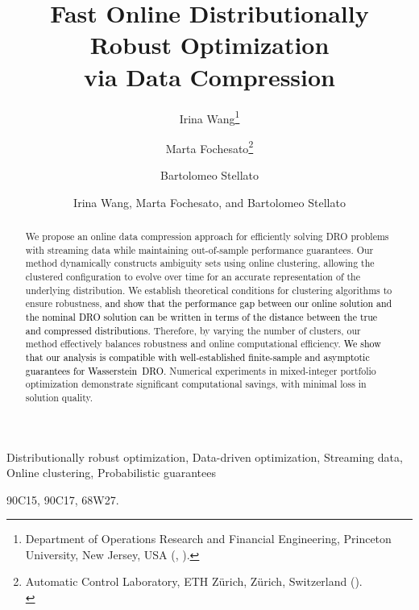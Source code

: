 \documentclass[12pt]{article}
\author{Irina Wang\thanks{Department of Operations Research and Financial Engineering, Princeton University, New Jersey, USA
  (\email{iywang@princeton.edu}, \email{bstellato@princeton.edu}).}
  \and Marta Fochesato\thanks{Automatic Control Laboratory, ETH Z\"{u}rich, Z\"{u}rich, Switzerland (\email{mfochesato@ethz.ch}).\\
  \myack
  }\\
  \and Bartolomeo Stellato\footnotemark[1]
}
\title{Fast Online Distributionally Robust Optimization \\via Data Compression }
\author{Irina Wang, Marta Fochesato, and Bartolomeo Stellato}
\newcommand{\RC}[1]{\textcolor{black}{#1}}
\newcommand{\RC}[1]{\textcolor{blue}{#1}}
\begin{document}
\maketitle

\begin{abstract}
We propose an online data compression approach for efficiently solving \gls{DRO} problems with streaming data while maintaining out-of-sample performance guarantees. 
Our method dynamically constructs ambiguity sets using online clustering, allowing the clustered configuration to evolve over time for an accurate representation of the underlying distribution. 
We establish theoretical conditions for clustering algorithms to ensure robustness, \RC{and show that the performance gap between our online solution and the nominal \gls{DRO} solution can be written in terms of the distance between the true and compressed distributions.} 
Therefore, by varying the number of clusters, our method effectively balances robustness and online computational efficiency.
\RC{We show that our analysis is compatible with well-established finite-sample and asymptotic guarantees for Wasserstein~\gls{DRO}.}
Numerical experiments in mixed-integer portfolio optimization demonstrate significant computational savings, with minimal loss in solution quality.
\end{abstract}
\ifsiam 
    \begin{keywords}
    Distributionally robust optimization, Data-driven optimization, Streaming data, Online clustering, Probabilistic guarantees
    \end{keywords}
    \begin{MSCcodes}
    90C15, 90C17, 68W27.
    \end{MSCcodes}
\fi

\glsresetall
\end{document}
